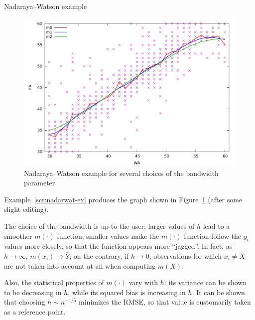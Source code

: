 \begin{script}[htbp]
  \caption{Nadaraya--Watson example}
  \label{scr:nadarwat-ex}
\end{script}

\begin{figure}[htbp]
  \centering
  \includegraphics[scale=0.5]{figures/nadarwat-ex}
  \caption{Nadaraya--Watson example for several choices of the bandwidth parameter}
  \label{fig:nadarwat-ex}
\end{figure}

Example~\ref{scr:nadarwat-ex} produces the graph shown in
Figure~\ref{fig:nadarwat-ex} (after some slight editing).

The choice of the bandwidth is up to the user: larger values of $h$
lead to a smoother $m(\cdot)$ function; smaller values make the
$m(\cdot)$ function follow the $y_i$ values more closely, so that the
function appears more ``jagged''. In fact, as $h \to \infty$, $m(x_i)
\to \bar{Y}$; on the contrary, if $h $, observations for which
$x_i \ne X$ are not taken into account at all when computing $m(X)$.

Also, the statistical properties of $m(\cdot)$ vary with $h$: its
variance can be shown to be decreasing in $h$, while its squared bias
is increasing in $h$.  It can be shown that choosing $h \sim n^{-1/5}$
minimizes the RMSE, so that value is customarily taken as a reference
point.

